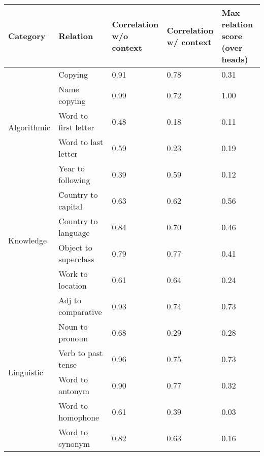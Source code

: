 \begin{tabular}{lllll}
\toprule
Category & Relation & \makecell{Correlation\\w/o context} & \makecell{Correlation\\w/ context} & \makecell{Max relation score\\(over heads)} \\
\midrule
\multirow{5}{*}{Algorithmic} & Copying & 0.91 & 0.78 & 0.31 \\
 & Name copying & 0.99 & 0.72 & 1.00 \\
 & Word to first letter & 0.48 & 0.18 & 0.11 \\
 & Word to last letter & 0.59 & 0.23 & 0.19 \\
 & Year to following & 0.39 & 0.59 & 0.12 \\
\multirow{4}{*}{Knowledge} & Country to capital & 0.63 & 0.62 & 0.56 \\
 & Country to language & 0.84 & 0.70 & 0.46 \\
 & Object to superclass & 0.79 & 0.77 & 0.41 \\
 & Work to location & 0.61 & 0.64 & 0.24 \\
\multirow{6}{*}{Linguistic} & Adj to comparative & 0.93 & 0.74 & 0.73 \\
 & Noun to pronoun & 0.68 & 0.29 & 0.28 \\
 & Verb to past tense & 0.96 & 0.75 & 0.73 \\
 & Word to antonym & 0.90 & 0.77 & 0.32 \\
 & Word to homophone & 0.61 & 0.39 & 0.03 \\
 & Word to synonym & 0.82 & 0.63 & 0.16 \\
\bottomrule
\end{tabular}

